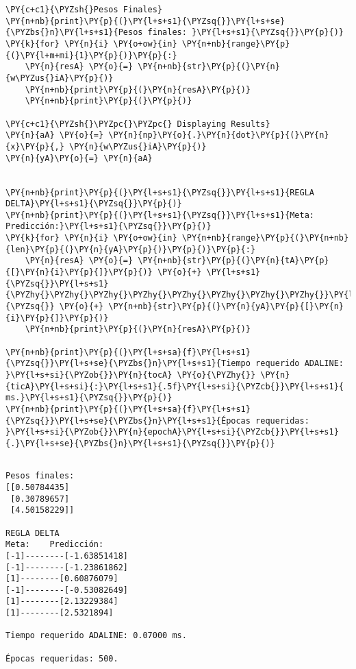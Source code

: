     \begin{tcolorbox}[breakable, size=fbox, boxrule=1pt, pad at break*=1mm,colback=cellbackground, colframe=cellborder]
\begin{Verbatim}[commandchars=\\\{\}]
\PY{c+c1}{\PYZsh{}Pesos Finales}
\PY{n+nb}{print}\PY{p}{(}\PY{l+s+s1}{\PYZsq{}}\PY{l+s+se}{\PYZbs{}n}\PY{l+s+s1}{Pesos finales: }\PY{l+s+s1}{\PYZsq{}}\PY{p}{)}
\PY{k}{for} \PY{n}{i} \PY{o+ow}{in} \PY{n+nb}{range}\PY{p}{(}\PY{l+m+mi}{1}\PY{p}{)}\PY{p}{:}
    \PY{n}{resA} \PY{o}{=} \PY{n+nb}{str}\PY{p}{(}\PY{n}{w\PYZus{}iA}\PY{p}{)}
    \PY{n+nb}{print}\PY{p}{(}\PY{n}{resA}\PY{p}{)}
    \PY{n+nb}{print}\PY{p}{(}\PY{p}{)}

\PY{c+c1}{\PYZsh{}\PYZpc{}\PYZpc{} Displaying Results}
\PY{n}{aA} \PY{o}{=} \PY{n}{np}\PY{o}{.}\PY{n}{dot}\PY{p}{(}\PY{n}{x}\PY{p}{,} \PY{n}{w\PYZus{}iA}\PY{p}{)}
\PY{n}{yA}\PY{o}{=} \PY{n}{aA}


\PY{n+nb}{print}\PY{p}{(}\PY{l+s+s1}{\PYZsq{}}\PY{l+s+s1}{REGLA DELTA}\PY{l+s+s1}{\PYZsq{}}\PY{p}{)}
\PY{n+nb}{print}\PY{p}{(}\PY{l+s+s1}{\PYZsq{}}\PY{l+s+s1}{Meta:    Predicción:}\PY{l+s+s1}{\PYZsq{}}\PY{p}{)}
\PY{k}{for} \PY{n}{i} \PY{o+ow}{in} \PY{n+nb}{range}\PY{p}{(}\PY{n+nb}{len}\PY{p}{(}\PY{n}{yA}\PY{p}{)}\PY{p}{)}\PY{p}{:}
    \PY{n}{resA} \PY{o}{=} \PY{n+nb}{str}\PY{p}{(}\PY{n}{tA}\PY{p}{[}\PY{n}{i}\PY{p}{]}\PY{p}{)} \PY{o}{+} \PY{l+s+s1}{\PYZsq{}}\PY{l+s+s1}{\PYZhy{}\PYZhy{}\PYZhy{}\PYZhy{}\PYZhy{}\PYZhy{}\PYZhy{}\PYZhy{}}\PY{l+s+s1}{\PYZsq{}} \PY{o}{+} \PY{n+nb}{str}\PY{p}{(}\PY{n}{yA}\PY{p}{[}\PY{n}{i}\PY{p}{]}\PY{p}{)}
    \PY{n+nb}{print}\PY{p}{(}\PY{n}{resA}\PY{p}{)}

\PY{n+nb}{print}\PY{p}{(}\PY{l+s+sa}{f}\PY{l+s+s1}{\PYZsq{}}\PY{l+s+se}{\PYZbs{}n}\PY{l+s+s1}{Tiempo requerido ADALINE: }\PY{l+s+si}{\PYZob{}}\PY{n}{tocA} \PY{o}{\PYZhy{}} \PY{n}{ticA}\PY{l+s+si}{:}\PY{l+s+s1}{.5f}\PY{l+s+si}{\PYZcb{}}\PY{l+s+s1}{ ms.}\PY{l+s+s1}{\PYZsq{}}\PY{p}{)}
\PY{n+nb}{print}\PY{p}{(}\PY{l+s+sa}{f}\PY{l+s+s1}{\PYZsq{}}\PY{l+s+se}{\PYZbs{}n}\PY{l+s+s1}{Épocas requeridas: }\PY{l+s+si}{\PYZob{}}\PY{n}{epochA}\PY{l+s+si}{\PYZcb{}}\PY{l+s+s1}{.}\PY{l+s+se}{\PYZbs{}n}\PY{l+s+s1}{\PYZsq{}}\PY{p}{)}
\end{Verbatim}
\end{tcolorbox}

    \begin{Verbatim}[commandchars=\\\{\}]

Pesos finales:
[[0.50784435]
 [0.30789657]
 [4.50158229]]

REGLA DELTA
Meta:    Predicción:
[-1]--------[-1.63851418]
[-1]--------[-1.23861862]
[1]--------[0.60876079]
[-1]--------[-0.53082649]
[1]--------[2.13229384]
[1]--------[2.5321894]

Tiempo requerido ADALINE: 0.07000 ms.

Épocas requeridas: 500.

    \end{Verbatim}

